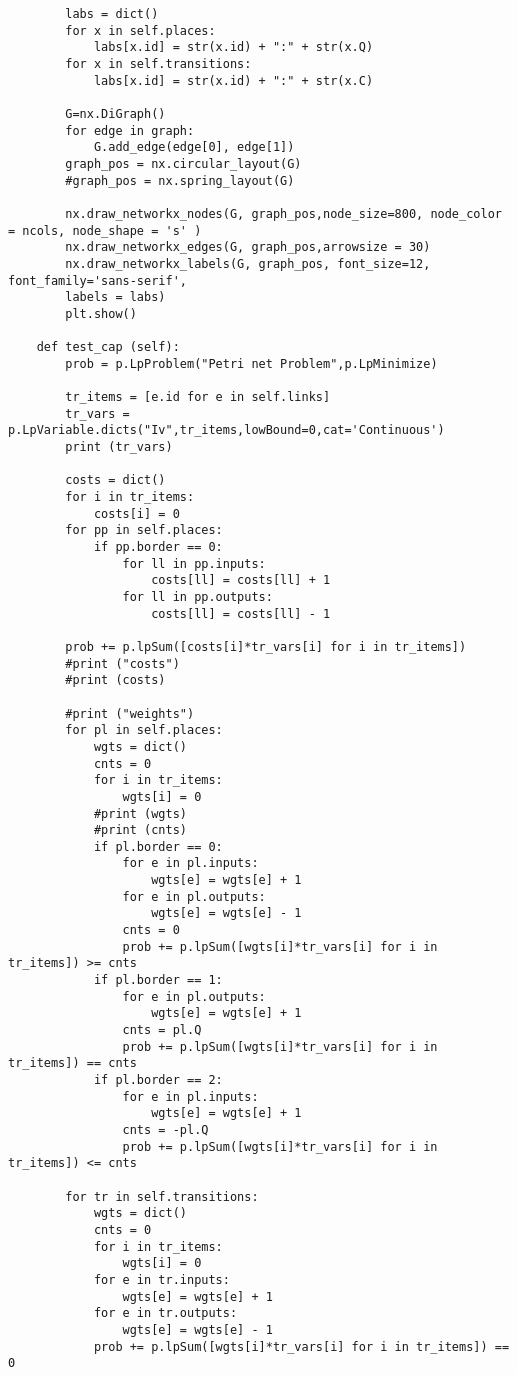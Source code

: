 \documentclass[12pt,a4paper]{book}
\begin{document}
\begin{verbatim}
        labs = dict()
        for x in self.places:
            labs[x.id] = str(x.id) + ":" + str(x.Q)
        for x in self.transitions:
            labs[x.id] = str(x.id) + ":" + str(x.C)

        G=nx.DiGraph()
        for edge in graph:
            G.add_edge(edge[0], edge[1])
        graph_pos = nx.circular_layout(G)
        #graph_pos = nx.spring_layout(G)
    
        nx.draw_networkx_nodes(G, graph_pos,node_size=800, node_color = ncols, node_shape = 's' )
        nx.draw_networkx_edges(G, graph_pos,arrowsize = 30)
        nx.draw_networkx_labels(G, graph_pos, font_size=12, font_family='sans-serif',
        labels = labs)
        plt.show()

    def test_cap (self):
        prob = p.LpProblem("Petri net Problem",p.LpMinimize)

        tr_items = [e.id for e in self.links]
        tr_vars = p.LpVariable.dicts("Iv",tr_items,lowBound=0,cat='Continuous')
        print (tr_vars)
        
        costs = dict()
        for i in tr_items:
            costs[i] = 0
        for pp in self.places:
            if pp.border == 0:
                for ll in pp.inputs:
                    costs[ll] = costs[ll] + 1
                for ll in pp.outputs:
                    costs[ll] = costs[ll] - 1

        prob += p.lpSum([costs[i]*tr_vars[i] for i in tr_items])
        #print ("costs")
        #print (costs)
        
        #print ("weights")
        for pl in self.places:
            wgts = dict()
            cnts = 0
            for i in tr_items:
                wgts[i] = 0
            #print (wgts)
            #print (cnts)
            if pl.border == 0:
                for e in pl.inputs:
                    wgts[e] = wgts[e] + 1
                for e in pl.outputs:
                    wgts[e] = wgts[e] - 1
                cnts = 0
                prob += p.lpSum([wgts[i]*tr_vars[i] for i in tr_items]) >= cnts
            if pl.border == 1:
                for e in pl.outputs:
                    wgts[e] = wgts[e] + 1
                cnts = pl.Q
                prob += p.lpSum([wgts[i]*tr_vars[i] for i in tr_items]) == cnts
            if pl.border == 2:
                for e in pl.inputs:
                    wgts[e] = wgts[e] + 1
                cnts = -pl.Q
                prob += p.lpSum([wgts[i]*tr_vars[i] for i in tr_items]) <= cnts

        for tr in self.transitions:
            wgts = dict()
            cnts = 0
            for i in tr_items:
                wgts[i] = 0
            for e in tr.inputs:
                wgts[e] = wgts[e] + 1
            for e in tr.outputs:
                wgts[e] = wgts[e] - 1
            prob += p.lpSum([wgts[i]*tr_vars[i] for i in tr_items]) == 0
            

\end{verbatim}
\end{document}
